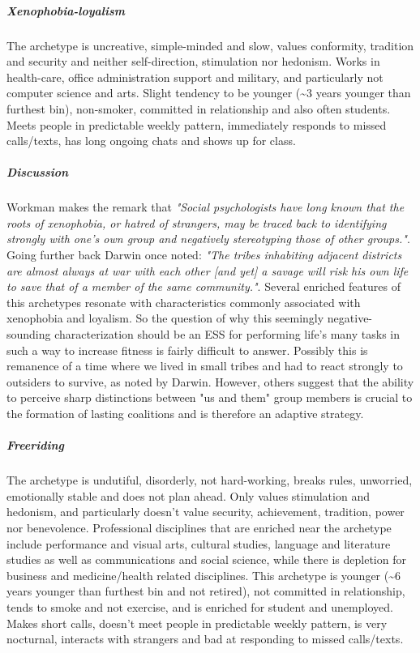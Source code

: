 \subparagraph*{Xenophobia-loyalism}
The \loyalist archetype is uncreative, simple-minded and slow, values conformity, tradition and security and neither self-direction, stimulation nor hedonism.
Works in health-care, office administration support and military, and particularly not computer science and arts.
Slight tendency to be younger (\textasciitilde3 years younger than furthest bin), non-smoker, committed in relationship and also often students.
Meets people in predictable weekly pattern, immediately responds to missed calls/texts, has long ongoing chats and shows up for class.

	\subparagraph{\textnormal{\textit{Discussion}}}
	Workman makes the remark that \textit{"Social psychologists have long known that the roots of xenophobia, or hatred of strangers, may be traced back to identifying strongly with one's own group and negatively stereotyping those of other groups."}. Going further back Darwin once noted: \textit{"The tribes inhabiting adjacent districts are almost always at war with each other [and yet] a savage will risk his own life to save that of a member of the same community."}.
	Several enriched features of this archetypes resonate with characteristics commonly associated with xenophobia and loyalism. So the question of why this seemingly negative-sounding characterization should be an ESS for performing life's many tasks in such a way to increase fitness is fairly difficult to answer. Possibly this is remanence of a time where we lived in small tribes and had to react strongly to outsiders to survive, as noted by Darwin.
	However, others suggest that the ability to perceive sharp distinctions between "us and them" group members is crucial to the formation of lasting coalitions and is therefore an adaptive strategy.

\subparagraph*{Freeriding}
The \hippie archetype is undutiful, disorderly, not hard-working, breaks rules, unworried, emotionally stable and does not plan ahead.
Only values stimulation and hedonism, and particularly doesn't value security, achievement, tradition, power nor benevolence.
Professional disciplines that are enriched near the archetype include performance and visual arts, cultural studies, language and literature studies as well as communications and social science, while there is depletion for business and medicine/health related disciplines.
This archetype is younger (\textasciitilde6 years younger than furthest bin and not retired), not committed in relationship, tends to smoke and not exercise, and is enriched for student and unemployed.
Makes short calls, doesn't meet people in predictable weekly pattern, is very nocturnal, interacts with strangers and bad at responding to missed calls/texts.

